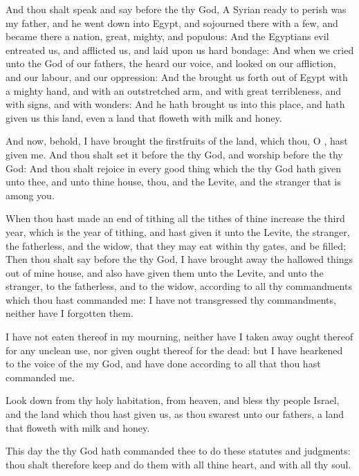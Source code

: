 \verse And thou shalt speak and say before the \LORD thy God, A Syrian ready to perish was my father, and he went down into Egypt, and sojourned there with a few, and became there a nation, great, mighty, and populous: \verse And the Egyptians evil entreated us, and afflicted us, and laid upon us hard bondage: \verse And when we cried unto the \LORD God of our fathers, the \LORD heard our voice, and looked on our affliction, and our labour, and our oppression: \verse And the \LORD brought us forth out of Egypt with a mighty hand, and with an outstretched arm, and with great terribleness, and with signs, and with wonders: \verse And he hath brought us into this place, and hath given us this land, even a land that floweth with milk and honey.

\verse And now, behold, I have brought the firstfruits of the land, which thou, O \LORD, hast given me. And thou shalt set it before the \LORD thy God, and worship before the \LORD thy God: \verse And thou shalt rejoice in every good thing which the \LORD thy God hath given unto thee, and unto thine house, thou, and the Levite, and the stranger that is among you.

\verse When thou hast made an end of tithing all the tithes of thine increase the third year, which is the year of tithing, and hast given it unto the Levite, the stranger, the fatherless, and the widow, that they may eat within thy gates, and be filled; \verse Then thou shalt say before the \LORD thy God, I have brought away the hallowed things out of mine house, and also have given them unto the Levite, and unto the stranger, to the fatherless, and to the widow, according to all thy commandments which thou hast commanded me: I have not transgressed thy commandments, neither have I forgotten them.

\verse I have not eaten thereof in my mourning, neither have I taken away ought thereof for any unclean use, nor given ought thereof for the dead: but I have hearkened to the voice of the \LORD my God, and have done according to all that thou hast commanded me.

\verse Look down from thy holy habitation, from heaven, and bless thy people Israel, and the land which thou hast given us, as thou swarest unto our fathers, a land that floweth with milk and honey.

\verse This day the \LORD thy God hath commanded thee to do these statutes and judgments: thou shalt therefore keep and do them with all thine heart, and with all thy soul.

